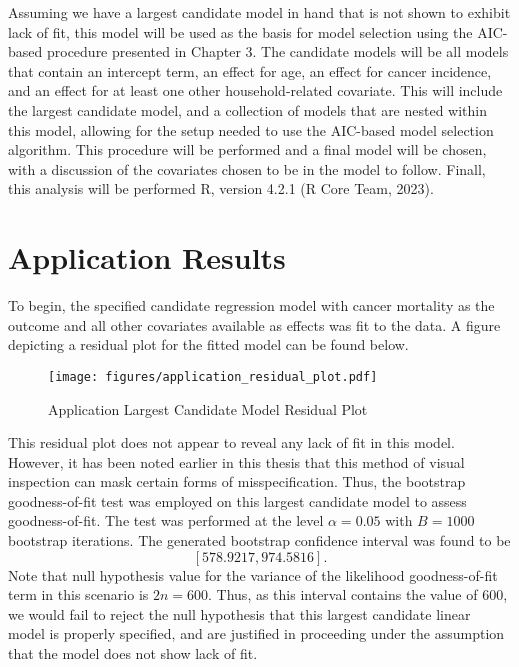 		Assuming we have a largest candidate model in hand that is not shown to exhibit lack of fit, this model will be used as the basis for model selection using the
		AIC-based procedure presented in Chapter 3. The candidate models will be all models that contain an intercept term, an effect for age, an effect for cancer
		incidence, and an effect for at least one other household-related covariate. This will include the largest candidate model, and a collection of models that
		are nested within this model, allowing for the setup needed to use the AIC-based model selection algorithm. This procedure will be performed and a final model
		will be chosen, with a discussion of the covariates chosen to be in the model to follow. Finall, this analysis will be performed R, version 4.2.1 (R Core Team, 2023).
		
		\section{Application Results} \label{sec:app_res}

		To begin, the specified candidate regression model with cancer mortality as the outcome and all other covariates available as effects was fit to the data. A
		figure depicting a residual plot for the fitted model can be found below.

		\begin{figure}[H]
			\centering
			\captionsetup{justification=centering}
			\texttt{[image: figures/application\_residual\_plot.pdf]}
			\caption{\label{fig:app_residual_plot} Application Largest Candidate Model Residual Plot}
		\end{figure}

		This residual plot does not appear to reveal any lack of fit in this model. However, it has been noted earlier in this thesis that this method of visual
		inspection can mask certain forms of misspecification. Thus, the bootstrap goodness-of-fit test was employed on this largest candidate model to assess
		goodness-of-fit. The test was performed at the level $\alpha = 0.05$ with $B = 1000$ bootstrap iterations. The generated bootstrap confidence interval
		was found to be
		\begin{equation}
			\left[ 578.9217, 974.5816 \right].
		\end{equation}
		Note that null hypothesis value for the variance of the likelihood goodness-of-fit term in this scenario is $2n = 600$. Thus, as this interval contains the
		value of $600$, we would fail to reject the null hypothesis that this largest candidate linear model is properly specified, and are justified in proceeding
		under the assumption that the model does not show lack of fit.

